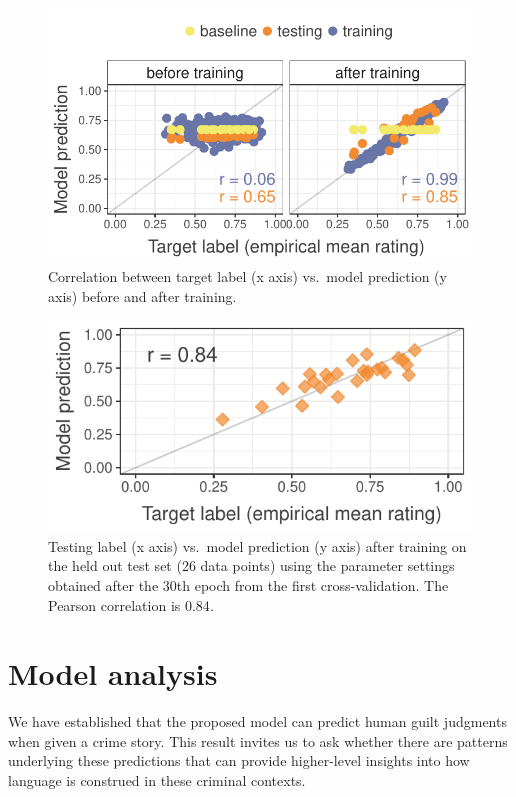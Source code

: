 \documentclass[11pt,a4paper]{article}
\begin{document}
\begin{figure}
  \includegraphics[width=\linewidth]{graphs/cv0-pred-target-epoch0-29.pdf}
  \caption{Correlation between target label (x axis) vs.\ model prediction (y axis) before and after training.}
  \label{fig:corr-cv0}
\end{figure}

\begin{figure}
  \includegraphics[width=\linewidth]{graphs/test-corr.pdf}
  \caption{Testing label (x axis) vs.\ model prediction (y axis) after training on the held out test set (26 data points) using the parameter settings obtained after the 30th epoch from the first cross-validation. The Pearson correlation is $0.84$.}
  \label{fig:test-corr}
\end{figure}


\section{Model analysis}

We have established that the proposed model can predict human guilt judgments when given a crime story. This result invites us to ask whether there are patterns underlying these predictions that can provide higher-level insights into how language is construed in these criminal contexts. 
\end{document}
